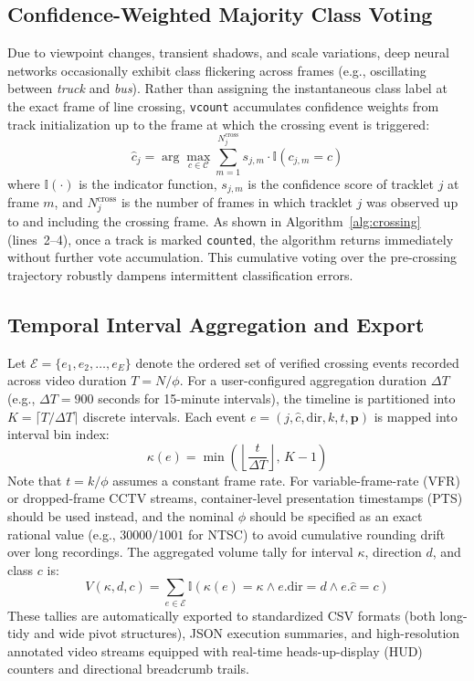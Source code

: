 \subsection{Confidence-Weighted Majority Class Voting}
Due to viewpoint changes, transient shadows, and scale variations, deep neural networks occasionally exhibit class flickering across frames (e.g., oscillating between \textit{truck} and \textit{bus}). Rather than assigning the instantaneous class label at the exact frame of line crossing, \texttt{vcount} accumulates confidence weights from track initialization up to the frame at which the crossing event is triggered:
\begin{equation}
    \hat{c}_j = \arg\max_{c \in \mathcal{C}} \sum_{m=1}^{N_j^{\text{cross}}} s_{j, m} \cdot \mathbb{I}(c_{j, m} = c)
    \label{eq:majority_vote}
\end{equation}
where $\mathbb{I}(\cdot)$ is the indicator function, $s_{j, m}$ is the confidence score of tracklet $j$ at frame $m$, and $N_j^{\text{cross}}$ is the number of frames in which tracklet $j$ was observed up to and including the crossing frame. As shown in Algorithm~\ref{alg:crossing} (lines~2--4), once a track is marked \texttt{counted}, the algorithm returns immediately without further vote accumulation. This cumulative voting over the pre-crossing trajectory robustly dampens intermittent classification errors.

\subsection{Temporal Interval Aggregation and Export}
Let $\mathcal{E} = \{e_1, e_2, \dots, e_E\}$ denote the ordered set of verified crossing events recorded across video duration $T = N/\phi$. For a user-configured aggregation duration $\Delta T$ (e.g., $\Delta T = 900$ seconds for 15-minute intervals), the timeline is partitioned into $K = \lceil T / \Delta T \rceil$ discrete intervals. Each event $e = (j, \hat{c}, \text{dir}, k, t, \mathbf{p})$ is mapped into interval bin index:
\begin{equation}
    \kappa(e) = \min\left( \left\lfloor \frac{t}{\Delta T} \right\rfloor, \, K - 1 \right)
\end{equation}
Note that $t = k/\phi$ assumes a constant frame rate. For variable-frame-rate (VFR) or dropped-frame CCTV streams, container-level presentation timestamps (PTS) should be used instead, and the nominal $\phi$ should be specified as an exact rational value (e.g., $30000/1001$ for NTSC) to avoid cumulative rounding drift over long recordings.
The aggregated volume tally for interval $\kappa$, direction $d$, and class $c$ is:
\begin{equation}
    V(\kappa, d, c) = \sum_{e \in \mathcal{E}} \mathbb{I}(\kappa(e) = \kappa \land e.\text{dir} = d \land e.\hat{c} = c)
\end{equation}
These tallies are automatically exported to standardized CSV formats (both long-tidy and wide pivot structures), JSON execution summaries, and high-resolution annotated video streams equipped with real-time heads-up-display (HUD) counters and directional breadcrumb trails.
